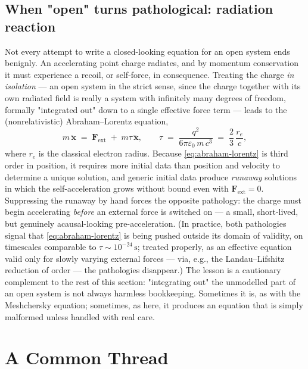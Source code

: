 \subsection{When "open" turns pathological: radiation reaction}

Not every attempt to write a closed-looking equation for an open
system ends benignly. An accelerating point charge radiates, and by
momentum conservation it must experience a recoil, or self-force, in
consequence. Treating the charge \emph{in isolation} --- an open
system in the strict sense, since the charge together with its own
radiated field is really a system with infinitely many degrees of
freedom, formally "integrated out" down to a single effective force
term --- leads to the (nonrelativistic) Abraham--Lorentz equation,
\begin{equation}
  m\,\ddot{\mathbf x} \;=\; \mathbf F_{\mathrm{ext}} \;+\;
  m\tau\,\dddot{\mathbf x} ,
  \qquad
  \tau \;=\; \frac{q^2}{6\pi\varepsilon_0\,m\,c^3}
  \;=\; \frac{2}{3}\,\frac{r_e}{c},
  \label{eq:abraham-lorentz}
\end{equation}
where $r_e$ is the classical electron radius. Because
\eqref{eq:abraham-lorentz} is third order in position, it requires
more initial data than position and velocity to determine a unique
solution, and generic initial data produce \emph{runaway} solutions
in which the self-acceleration grows without bound even with
$\mathbf F_{\mathrm{ext}}=0$. Suppressing the runaway by hand forces
the opposite pathology: the charge must begin accelerating
\emph{before} an external force is switched on --- a small, short-lived,
but genuinely acausal-looking pre-acceleration. (In practice, both
pathologies signal that \eqref{eq:abraham-lorentz} is being pushed
outside its domain of validity, on timescales comparable to $\tau
\sim 10^{-24}\,\mathrm s$; treated properly, as an effective equation
valid only for slowly varying external forces --- via, e.g., the
Landau--Lifshitz reduction of order --- the pathologies disappear.)
The lesson is a cautionary complement to the rest of this section:
"integrating out" the unmodelled part of an open system is not
always harmless bookkeeping. Sometimes it is, as with the Meshchersky
equation; sometimes, as here, it produces an equation that is simply
malformed unless handled with real care.

\section{A Common Thread}
\label{sec:common-thread}

